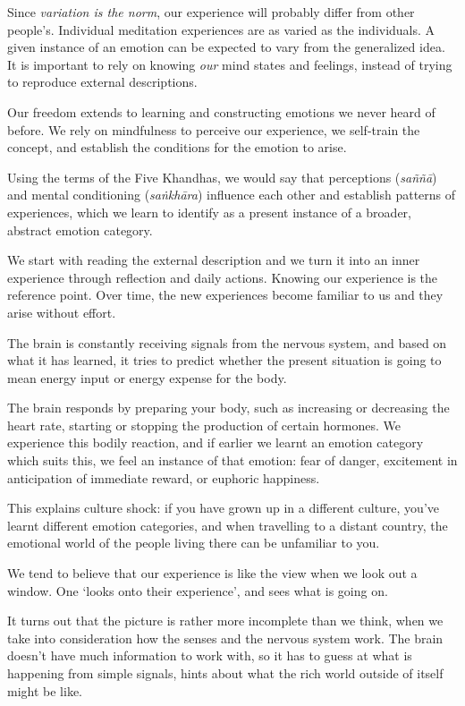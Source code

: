 Since \emph{variation is the norm}, our experience will probably differ
from other people's. Individual meditation experiences are as varied as
the individuals. A given instance of an emotion can be expected to vary
from the generalized idea. It is important to rely on knowing \emph{our}
mind states and feelings, instead of trying to reproduce external
descriptions.

Our freedom extends to learning and constructing emotions we never heard
of before. We rely on mindfulness to perceive our experience, we
self-train the concept, and establish the conditions for the emotion to
arise.

Using the terms of the Five Khandhas, we would say that perceptions
(\emph{saññā}) and mental conditioning (\emph{saṅkhāra}) influence each
other and establish patterns of experiences, which we learn to identify
as a present instance of a broader, abstract emotion category.

We start with reading the external description and we turn it into an
inner experience through reflection and daily actions. Knowing our
experience is the reference point. Over time, the new experiences become
familiar to us and they arise without effort.


The brain is constantly receiving signals from the nervous system, and
based on what it has learned, it tries to predict whether the present
situation is going to mean energy input or energy expense for the body.

The brain responds by preparing your body, such as increasing or
decreasing the heart rate, starting or stopping the production of
certain hormones. We experience this bodily reaction, and if earlier we
learnt an emotion category which suits this, we feel an instance of that
emotion: fear of danger, excitement in anticipation of immediate reward,
or euphoric happiness.

This explains culture shock: if you have grown up in a different
culture, you've learnt different emotion categories, and when travelling
to a distant country, the emotional world of the people living there can
be unfamiliar to you.

We tend to believe that our experience is like the view when we look out
a window. One `looks onto their experience', and sees what is going on.

It turns out that the picture is rather more incomplete than we think,
when we take into consideration how the senses and the nervous system
work. The brain doesn't have much information to work with, so it has to
guess at what is happening from simple signals, hints about what the
rich world outside of itself might be like.

